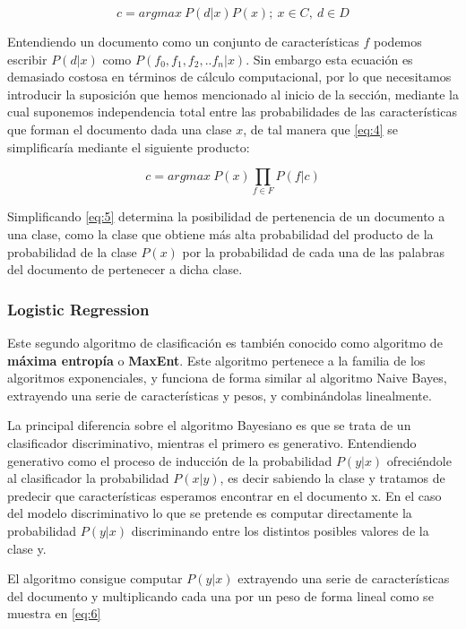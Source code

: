 \begin{equation} \label{eq:4}
\mathit{c = argmax\ P(d|x)P(x);\ x \in C,\ d \in D}
\end{equation}

Entendiendo un documento como un conjunto de características \(f\) podemos escribir  \(P(d|x)\) como \(P(f_0,f_1,f_2,..f_n|x)\).
Sin embargo esta ecuación es demasiado costosa en términos de cálculo computacional, por lo que necesitamos introducir la suposición que hemos mencionado al inicio de la sección, mediante la cual suponemos independencia total entre las probabilidades de las características  que forman el documento dada una clase \(x\), de tal manera que \ref{eq:4} se simplificaría mediante el siguiente producto:

\begin{equation} \label{eq:5}
\mathit{c = argmax\ P(x)\prod_{f \in F} P(f|c)}
\end{equation} 

Simplificando \ref{eq:5} determina la posibilidad de pertenencia de un documento a una clase, como la clase que obtiene más alta probabilidad del producto de la probabilidad de la clase \(P(x)\) por la probabilidad de cada una de las palabras del documento de pertenecer a dicha clase.


\subsubsection{Logistic Regression}\label{lr}

Este segundo algoritmo de clasificación es también conocido como algoritmo de \textbf{máxima entropía} o \textbf{MaxEnt}. Este algoritmo pertenece a la familia de los algoritmos exponenciales, y funciona de forma similar al algoritmo Naive Bayes, extrayendo una serie de características y pesos, y combinándolas linealmente.

La principal diferencia sobre el algoritmo Bayesiano es que se trata de un clasificador discriminativo, mientras el primero es generativo. Entendiendo generativo como el proceso de inducción de la probabilidad \(P(y|x)\) ofreciéndole al clasificador la probabilidad \(P(x|y)\), es decir sabiendo la clase y tratamos de predecir que características esperamos encontrar en el documento x. En el caso del modelo discriminativo lo que se pretende es computar directamente la probabilidad \(P(y|x)\) discriminando entre los distintos posibles valores de la clase y.

El algoritmo consigue computar \(P(y|x)\) extrayendo una serie de características del documento y multiplicando cada una por un peso de forma lineal como se muestra en \ref{eq:6}

